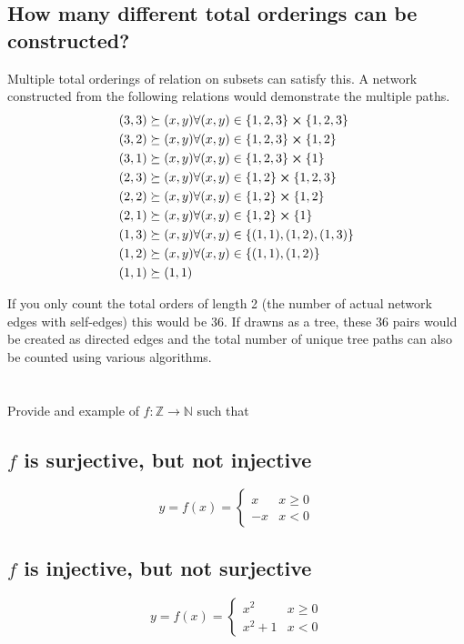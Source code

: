 \documentclass[]{article}
\newcommand{\N}{\mathbb{N}}
\newcommand{\Z}{\mathbb{Z}}
\begin{document}
\subsection{How many different total orderings can be constructed?}
Multiple total orderings of relation on subsets can satisfy this.
A network constructed from the following relations would demonstrate the multiple paths.
\begin{align*}
	(3,3) &\succeq (x,y) \forall (x,y) \in \{1,2,3\}\cross\{1,2,3\}\\
	(3,2) &\succeq (x,y) \forall (x,y) \in \{1,2,3\}\cross\{1,2\}\\
	(3,1) &\succeq (x,y) \forall (x,y) \in \{1,2,3\}\cross\{1\}\\
	(2,3) &\succeq (x,y) \forall (x,y) \in \{1,2\}\cross\{1,2,3\}\\
	(2,2) &\succeq (x,y) \forall (x,y) \in \{1,2\}\cross\{1,2\}\\
	(2,1) &\succeq (x,y) \forall (x,y) \in \{1,2\}\cross\{1\}\\
	(1,3) &\succeq (x,y) \forall (x,y) \in \{(1,1),(1,2),(1,3)\}\\
	(1,2) &\succeq (x,y) \forall (x,y) \in \{(1,1),(1,2)\}\\
	(1,1) &\succeq (1,1)
\end{align*}

If you only count the total orders of length 2 
(the number of actual network edges with self-edges) this would be 36.
If drawns as a tree, these 36 pairs would be created as directed edges and the 
total number of unique tree paths can also be counted using various algorithms.

\newpage
\section{}
Provide and example of $f : \Z \to \N$ such that

\subsection{$f$ is surjective, but not injective}

\begin{displaymath}
	y = f(x) =
	\begin{cases}
		x & x \geq 0\\
		-x & x < 0
	\end{cases}
\end{displaymath}

\subsection{$f$ is injective, but not surjective}
\begin{displaymath}
	y = f(x) =
	\begin{cases}
		x^2 & x \geq 0\\
		x^2 + 1 & x < 0
	\end{cases}
\end{displaymath}
\end{document}
